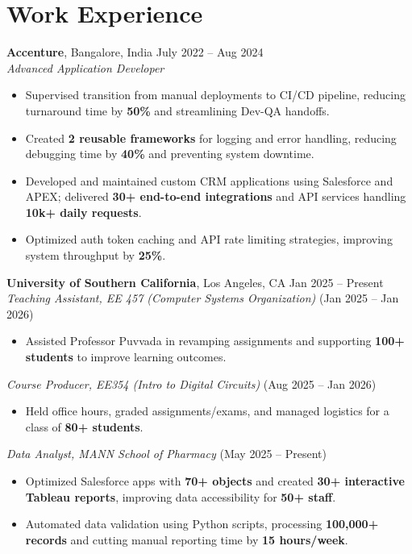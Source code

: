 \documentclass[letterpaper,10pt]{article}
\begin{document}
\section*{Work Experience}
    \textbf{Accenture}, Bangalore, India \hfill July 2022 -- Aug 2024 \\
    \textit{Advanced Application Developer}
    \begin{itemize}[leftmargin=*]
        \item Supervised transition from manual deployments to CI/CD pipeline, reducing turnaround time by \textbf{50\%} and streamlining Dev-QA handoffs.
        \item Created \textbf{2 reusable frameworks} for logging and error handling, reducing debugging time by \textbf{40\%} and preventing system downtime.
        \item Developed and maintained custom CRM applications using Salesforce and APEX; delivered \textbf{30+ end-to-end integrations} and API services handling \textbf{10k+ daily requests}.
        \item Optimized auth token caching and API rate limiting strategies, improving system throughput by \textbf{25\%}.
    \end{itemize}

    \vspace{2pt}
    \textbf{University of Southern California}, Los Angeles, CA \hfill Jan 2025 -- Present \\
    \textit{Teaching Assistant, EE 457 (Computer Systems Organization)} \hfill (Jan 2025 -- Jan 2026)
    \begin{itemize}[leftmargin=*]
        \item Assisted Professor Puvvada in revamping assignments and supporting \textbf{100+ students} to improve learning outcomes.
    \end{itemize}

    \textit{Course Producer, EE354 (Intro to Digital Circuits)} \hfill (Aug 2025 -- Jan 2026)
    \begin{itemize}[leftmargin=*]
        \item Held office hours, graded assignments/exams, and managed logistics for a class of \textbf{80+ students}.
    \end{itemize}
    
    \textit{Data Analyst, MANN School of Pharmacy} \hfill (May 2025 -- Present)
    \begin{itemize}[leftmargin=*]
        \item Optimized Salesforce apps with \textbf{70+ objects} and created \textbf{30+ interactive Tableau reports}, improving data accessibility for \textbf{50+ staff}.
        \item Automated data validation using Python scripts, processing \textbf{100,000+ records} and cutting manual reporting time by \textbf{15 hours/week}.
    \end{itemize}
\end{document}
